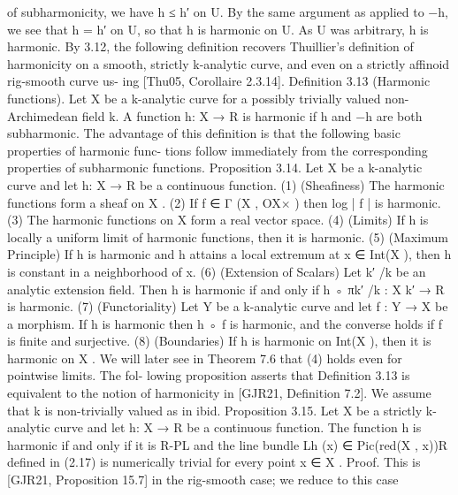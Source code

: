 \documentclass[
  10pt,
]{article}
\newenvironment{Shaded}{}{}
\newcommand{\NormalTok}[1]{#1}
\begin{document}
\begin{Shaded}
\begin{Highlighting}[]
\NormalTok{of subharmonicity, we have h ≤ h′ on U. By the same argument as applied to −h, we see}
\NormalTok{that h = h′ on U, so that h is harmonic on U. As U was arbitrary, h is harmonic.}
\NormalTok{  By 3.12, the following definition recovers Thuillier’s definition of harmonicity on a}
\NormalTok{smooth, strictly k{-}analytic curve, and even on a strictly affinoid rig{-}smooth curve us{-}}
\NormalTok{ing [Thu05, Corollaire 2.3.14].}
\NormalTok{Definition 3.13 (Harmonic functions). Let X be a k{-}analytic curve for a possibly trivially}
\NormalTok{valued non{-}Archimedean field k. A function h: X → R is harmonic if h and −h are both}
\NormalTok{subharmonic.}
\NormalTok{   The advantage of this definition is that the following basic properties of harmonic func{-}}
\NormalTok{tions follow immediately from the corresponding properties of subharmonic functions.}
\NormalTok{Proposition 3.14. Let X be a k{-}analytic curve and let h: X → R be a continuous function.}
\NormalTok{     (1) (Sheafiness) The harmonic functions form a sheaf on X .}
\NormalTok{     (2) If f ∈ Γ (X , OX× ) then log | f | is harmonic.}
\NormalTok{     (3) The harmonic functions on X form a real vector space.}
\NormalTok{     (4) (Limits) If h is locally a uniform limit of harmonic functions, then it is harmonic.}
\NormalTok{     (5) (Maximum Principle) If h is harmonic and h attains a local extremum at x ∈ Int(X ),}
\NormalTok{         then h is constant in a neighborhood of x.}
\NormalTok{     (6) (Extension of Scalars) Let k′ /k be an analytic extension field. Then h is harmonic}
\NormalTok{         if and only if h ◦ πk′ /k : X k′ → R is harmonic.}
\NormalTok{     (7) (Functoriality) Let Y be a k{-}analytic curve and let f : Y → X be a morphism. If h is}
\NormalTok{         harmonic then h ◦ f is harmonic, and the converse holds if f is finite and surjective.}
\NormalTok{     (8) (Boundaries) If h is harmonic on Int(X ), then it is harmonic on X .}
\NormalTok{   We will later see in Theorem 7.6 that (4) holds even for pointwise limits. The fol{-}}
\NormalTok{lowing proposition asserts that Definition 3.13 is equivalent to the notion of harmonicity}
\NormalTok{in [GJR21, Definition 7.2]. We assume that k is non{-}trivially valued as in ibid.}
\NormalTok{Proposition 3.15. Let X be a strictly k{-}analytic curve and let h: X → R be a continuous}
\NormalTok{function. The function h is harmonic if and only if it is R{-}PL and the line bundle Lh (x) ∈}
\NormalTok{Pic(red(X , x))R defined in (2.17) is numerically trivial for every point x ∈ X .}
\NormalTok{Proof. This is [GJR21, Proposition 15.7] in the rig{-}smooth case; we reduce to this case}

\end{Highlighting}
\end{Shaded}
\end{document}
